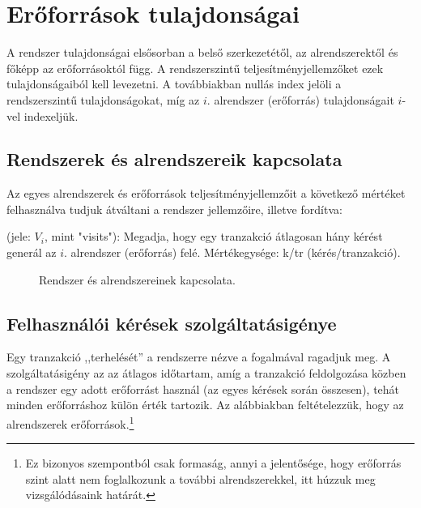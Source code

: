 \section{Erőforrások tulajdonságai}

A rendszer tulajdonságai elsősorban a belső szerkezetétől, az alrendszerektől és főképp az erőforrásoktól függ. A rendszerszintű teljesítményjellemzőket ezek tulajdonságaiból kell levezetni. A továbbiakban nullás index jelöli a rendszerszintű tulajdonságokat, míg az $i.$ alrendszer (erőforrás) tulajdonságait $i$-vel indexeljük.

\subsection{Rendszerek és alrendszereik kapcsolata}

Az egyes alrendszerek és erőforrások teljesítményjellemzőit a következő mértéket felhasználva tudjuk átváltani a rendszer jellemzőire, illetve fordítva:

\begin{definicio}
 (jele: $V_i$, mint "visits"): Megadja, hogy egy tranzakció átlagosan hány kérést generál az $i.$ alrendszer (erőforrás) felé. Mértékegysége: k/tr (kérés/tranzakció).
\end{definicio}

\begin{figure}[H]
	\hspace{1.5cm}
	\centering
	
	\caption{Rendszer és alrendszereinek kapcsolata.}
	\label{fig:subsystems}
\end{figure}

\subsection{Felhasználói kérések szolgáltatásigénye}

Egy tranzakció ,,terhelését'' a rendszerre nézve a  fogalmával ragadjuk meg. A szolgáltatásigény az az átlagos időtartam, amíg a tranzakció feldolgozása közben a rendszer egy adott erőforrást használ (az egyes kérések során összesen), tehát minden erőforráshoz külön érték tartozik. Az alábbiakban feltételezzük, hogy az alrendszerek erőforrások.\footnote{Ez bizonyos szempontból csak formaság, annyi a jelentősége, hogy erőforrás szint alatt nem foglalkozunk a további alrendszerekkel, itt húzzuk meg vizsgálódásaink határát.}


